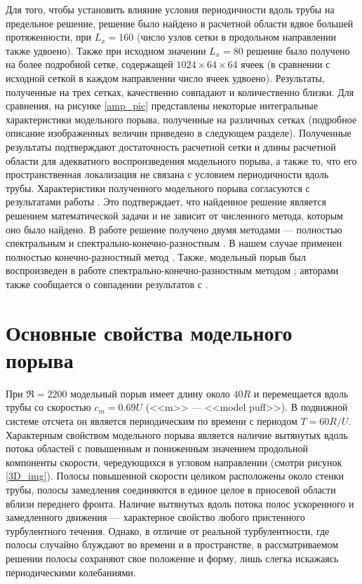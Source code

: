 Для того, чтобы установить влияние условия периодичности вдоль трубы на предельное решение, решение было найдено в расчетной области вдвое большей протяженности, при $L_x = 160$ (число узлов сетки в продольном направлении также удвоено). Также при исходном значении $L_x = 80$ решение было получено на более подробной сетке, содержащей $1024 \times 64 \times 64$ ячеек (в сравнении с исходной сеткой в каждом направлении число ячеек удвоено). Результаты, полученные на трех сетках, качественно совпадают и количественно близки. Для сравнения, на рисунке \ref{amp_pic} представлены некоторые интегральные характеристики модельного порыва, полученные на различных сетках (подробное описание изображенных величин приведено в следующем разделе). Полученные результаты подтверждают достаточность расчетной сетки и длины расчетной области для адекватного воспроизведения модельного порыва, а также то, что его пространственная локализация не связана с условием периодичности вдоль трубы. Характеристики полученного модельного порыва согласуются с результатами работы \cite{Avila2013}. Это подтверждает, что найденное решение является решением математической задачи и не зависит от численного метода, которым оно было найдено. В работе \cite{Avila2013} решение получено двумя методами --- полностью спектральным \cite{Meseguer2007} и спектрально-конечно-разностным \cite{Willis2009}. В нашем случае применен полностью конечно-разностный метод \cite{Nikitin2006}. Также, модельный порыв был воспроизведен в работе \cite{Chantry2014} спектрально-конечно-разностным методом \cite{Willis2009}; авторами также сообщается о совпадении результатов с \cite{Avila2013}. 


\section{Основные свойства модельного порыва}

При $\Re=2200$ модельный порыв имеет длину около $40R$ и перемещается вдоль трубы со скоростью $c_m = 0.69U$ (<<m>> --- <<model puff>>). В подвижной системе отсчета он является периодическим по времени с периодом $T = 60 R/U$. Характерным свойством модельного порыва является наличие вытянутых вдоль потока областей с повышенным и пониженным значением продольной компоненты скорости, чередующихся в угловом направлении (смотри рисунок \ref{3D_img}). Полосы повышенной скорости целиком расположены около стенки трубы, полосы замедления соединяются в единое целое в приосевой области вблизи переднего фронта. Наличие вытянутых вдоль потока полос ускоренного и замедленного движения --- характерное свойство любого пристенного турбулентного течения. Однако, в отличие от реальной турбулентности, где полосы случайно блуждают во времени и в пространстве, в рассматриваемом решении полосы сохраняют свое положение и форму, лишь слегка искажаясь периодическими колебаниями. 

